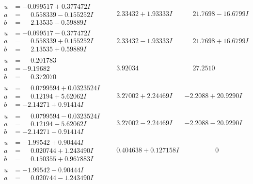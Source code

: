 \documentclass[1p]{elsarticle_modified}
\theoremstyle{definition}
\begin{document}
$$\begin{array}{c|c|c}
\begin{aligned}
u &= -0.099517 + 0.377472 I \\
a &= \phantom{-}0.558339 - 0.155252 I \\
b &= \phantom{-}2.13535 - 0.59889 I\end{aligned}
 & \phantom{-}2.33432 + 1.93333 I & \phantom{-}21.7698 - 16.6799 I \\ \hline\begin{aligned}
u &= -0.099517 - 0.377472 I \\
a &= \phantom{-}0.558339 + 0.155252 I \\
b &= \phantom{-}2.13535 + 0.59889 I\end{aligned}
 & \phantom{-}2.33432 - 1.93333 I & \phantom{-}21.7698 + 16.6799 I \\ \hline\begin{aligned}
u &= \phantom{-}0.201783\phantom{ +0.000000I} \\
a &= -9.19682\phantom{ +0.000000I} \\
b &= \phantom{-}0.372070\phantom{ +0.000000I}\end{aligned}
 & \phantom{-}3.92034\phantom{ +0.000000I} & \phantom{-}27.2510\phantom{ +0.000000I} \\ \hline\begin{aligned}
u &= \phantom{-}0.0799594 + 0.0323524 I \\
a &= \phantom{-}0.12194 + 5.62062 I \\
b &= -2.14271 + 0.91414 I\end{aligned}
 & \phantom{-}3.27002 + 2.24469 I & -2.2088 + 20.9290 I \\ \hline\begin{aligned}
u &= \phantom{-}0.0799594 - 0.0323524 I \\
a &= \phantom{-}0.12194 - 5.62062 I \\
b &= -2.14271 - 0.91414 I\end{aligned}
 & \phantom{-}3.27002 - 2.24469 I & -2.2088 - 20.9290 I \\ \hline\begin{aligned}
u &= -1.99542 + 0.90444 I \\
a &= \phantom{-}0.020744 + 1.243490 I \\
b &= \phantom{-}0.150355 + 0.967883 I\end{aligned}
 & \phantom{-}0.404638 + 0.127158 I & \phantom{-0.000000 } 0 \\ \hline\begin{aligned}
u &= -1.99542 - 0.90444 I \\
a &= \phantom{-}0.020744 - 1.243490 I \\

\end{aligned}
\end{array}$$
\end{document}
